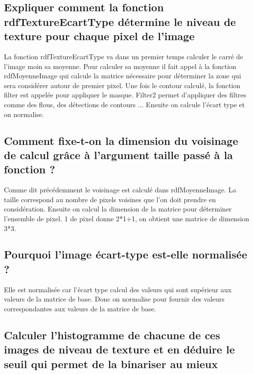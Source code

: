 \documentclass[a4paper,12pt]{report}
\begin{document}
\subsection*{Expliquer comment la fonction rdfTextureEcartType détermine le niveau de texture pour chaque pixel de l'image}

La fonction rdfTextureEcartType va dans un premier temps calculer le carré de l'image moin sa moyenne. Pour calculer sa moyenne il fait appel à la fonction rdfMoyenneImage qui calcule la matrice nécessaire pour déterminer la zone qui sera considérer autour de premier pixel. Une fois le contour calculé, la fonction filter est appelée pour appliquer le masque. Filter2 permet d'appliquer des filtres comme des flous, des détections de contours ...
Ensuite on calcule l'écart type et on normalise.

\subsection*{Comment fixe-t-on la dimension du voisinage de calcul grâce à l'argument taille passé à la fonction ?}

Comme dit précédemment le voisinage est calculé dans rdfMoyenneImage. La taille correspond au nombre de pixels voisines que l'on doit prendre en considération. Ensuite on calcul la dimension de la matrice pour déterminer l'ensemble de pixel. 1 de pixel donne 2*1+1, on obtient une matrice de dimension 3*3.

\subsection*{Pourquoi l'image écart-type est-elle normalisée ?}

Elle est normalisée car l'écart type calcul des valeurs qui sont supérieur aux valeurs de la matrice de base. Donc on normalise pour fournir des valeurs correspondantes aux valeurs de la matrice de base.

\newpage

\subsection*{ Calculer l'histogramme de chacune de ces images de niveau de texture et en déduire le seuil qui permet de la binariser au mieux}
\end{document}
